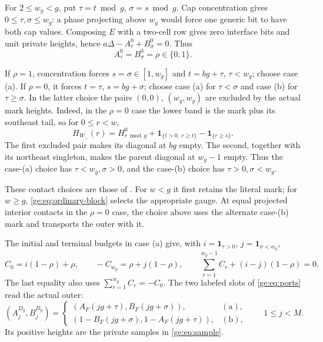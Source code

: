 \documentclass[11pt,a4paper]{amsart}
\numberwithin{equation}{section}
\theoremstyle{plain}
\theoremstyle{definition}
\begin{document}
For \(2\le w_g<g\), put \(\tau=t\bmod g\), \(\sigma=s\bmod g\).
Cap concentration gives \(0\le\tau,\sigma\le w_g\): a phase
projecting above \(w_g\) would force one generic bit to have both
cap values.  Composing \(E\) with a two-cell row gives zero
interface bits and unit private heights, hence
\(a\Delta-A^0_\tau+B^0_\sigma=0\).  Thus
\begin{equation}\label{eq:gluing-ordinary-slot}
 A^0_\tau=B^0_\sigma=\rho\in\{0,1\}.
\end{equation}

If \(\rho=1\), concentration forces \(s=\sigma\in[1,w_g]\) and
\(t=bg+\tau\), \(\tau<w_g\); choose case (a).  If \(\rho=0\),
it forces \(t=\tau\), \(s=bg+\sigma\); choose case (a) for
\(\tau<\sigma\) and case (b) for \(\tau\ge\sigma\).
In the latter choice the pairs \((0,0)\), \((w_g,w_g)\) are
excluded by the actual mark heights.  Indeed, in the \(\rho=0\)
case the lower band is the mark plus its southeast tail, so for
\(0\le r<w\),
\begin{equation}\label{eq:gluing-original-ordinary-mark}
 H_{W_-}(r)=H^0_{r\bmod g}
       +\mathbf1_{\{t>0,\ r\ge t\}}-\mathbf1_{\{r\ge s\}}.
\end{equation}
The first excluded pair makes its diagonal at \(bg\) empty.  The second, together with its northeast singleton, makes the parent diagonal at \(w_g-1\) empty.  Thus the case-(a) choice has \(\tau<w_g,\sigma>0\), and the case-(b) choice has \(\tau>0,\sigma<w_g\).

These contact choices are those of .
For \(w<g\) it first retains the literal mark; for \(w\ge g\),
\eqref{ge:eq:ordinary-block} selects the appropriate gauge.
At equal projected interior contacts in the \(\rho=0\) case,
the choice above uses the alternate case-(b) mark and transports
the outer with it.

The initial and terminal budgets in case (a) give, with
\(i=\mathbf1_{\tau>0}\), \(j=\mathbf1_{\sigma<w_g}\),
\[
 C_0=i(1-\rho)+\rho,\qquad -C_{w_g}=\rho+j(1-\rho),
 \qquad\sum_{r=1}^{w_g-1}C_r+(i-j)(1-\rho)=0.
\]
The last equality also uses \(\sum_{r=1}^{w_g}C_r=-C_0\).
The two labeled slots of \eqref{ge:eq:ports} read the actual outer:
\[
 (A^{D_g}_j,B^{D_g}_j)=
 \begin{cases}
 (A_F(jg+\tau),B_F(jg+\sigma)),&\mathrm{(a)},\\
 (1-B_F(jg+\sigma),1-A_F(jg+\tau)),&\mathrm{(b)},
 \end{cases}
 \qquad 1\le j<M.
\]
Its positive heights are the private samples in \eqref{ge:eq:sample}.
\end{document}
